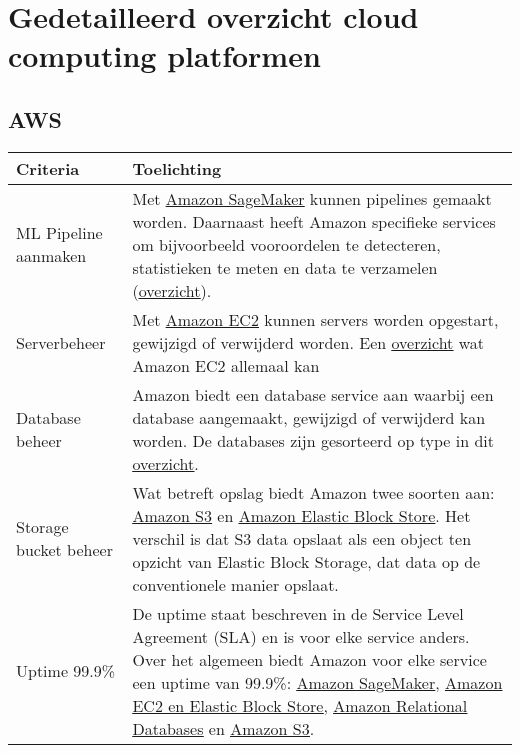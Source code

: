 \section*{Gedetailleerd overzicht cloud computing platformen}\label{appendix:detailed-overview-of-cloud-computing-platforms}

\subsection*{AWS}\label{appendix:detailed-overview-of-cloud-computing-platforms:aws}
\begin{table}[hbt!]
  \centering
  \begin{tabular}{|p{.2\linewidth}|p{.74\linewidth}|}
  \hline
  \textbf{Criteria} & \textbf{Toelichting} \\ \hline
    ML Pipeline \newline aanmaken
    &
    Met \underline{\href{https://aws.amazon.com/sagemaker/pipelines/}{Amazon SageMaker}} kunnen pipelines gemaakt worden. Daarnaast heeft Amazon specifieke services om bijvoorbeeld vooroordelen te detecteren, statistieken te meten en data te verzamelen (\underline{\href{https://aws.amazon.com/machine-learning/}{overzicht}}).
    \\ \hline

    Serverbeheer
    &
    Met \underline{\href{https://aws.amazon.com/ec2/}{Amazon EC2}} kunnen servers worden opgestart, gewijzigd of verwijderd worden. Een \underline{\href{https://aws.amazon.com/ec2/features/}{overzicht}} wat Amazon EC2 allemaal kan
    \\ \hline

    Database beheer
    &
    Amazon biedt een database service aan waarbij een database aangemaakt, gewijzigd of verwijderd kan worden. De databases zijn gesorteerd op type in dit \underline{\href{https://aws.amazon.com/products/databases/?nc2=h_ql_prod_db}{overzicht}}.
    \\ \hline

    Storage \newline bucket beheer
    &
    Wat betreft opslag biedt Amazon twee soorten aan: \underline{\href{https://aws.amazon.com/s3}{Amazon S3}} en \underline{\href{https://aws.amazon.com/ebs}{Amazon Elastic Block Store}}. Het verschil is dat S3 data opslaat als een object ten opzicht van Elastic Block Storage, dat data op de conventionele manier opslaat.
    \\ \hline

    Uptime 99.9\%
    &
    De uptime staat beschreven in de Service Level Agreement (SLA) en is voor elke service anders. Over het algemeen biedt Amazon voor elke service een uptime van 99.9\%: \underline{\href{https://aws.amazon.com/sagemaker/sla/}{Amazon SageMaker}}, \underline{\href{https://aws.amazon.com/compute/sla/}{Amazon EC2 en Elastic Block Store}}, \underline{\href{https://aws.amazon.com/rds/sla/}{Amazon Relational Databases}} en \underline{\href{https://aws.amazon.com/s3/sla/}{Amazon S3}}.
    \\ \hline


\end{tabular}
\end{table}
